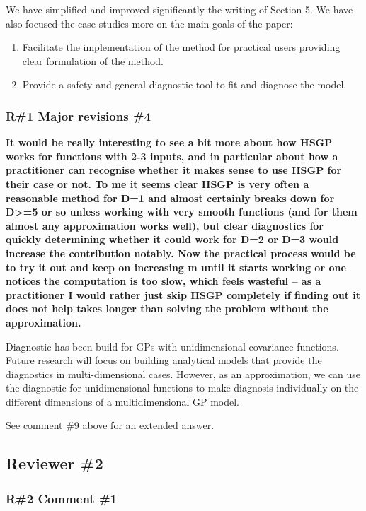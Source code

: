 \documentclass[11pt]{report}
\begin{document}
We have simplified and improved significantly the writing of Section 5. We have also focused the case studies more on the main goals of the paper:
\begin{enumerate}
\item Facilitate the implementation of the method for practical users providing clear formulation of the method.
\item Provide a safety and general diagnostic tool to fit and diagnose the model.
\end{enumerate}
 

\subsubsection*{R\#1 Major revisions \#4}

\textbf{It would be really interesting to see a bit more about how HSGP works for functions with 2-3 inputs, and in particular about how a practitioner can recognise whether it makes sense to use HSGP for their case or not. To me it seems clear HSGP is very often a reasonable method for D=1 and almost certainly breaks down for D>=5 or so unless working with very smooth functions (and for them almost any approximation works well), but clear diagnostics for quickly determining whether it could work for D=2 or D=3 would increase the contribution notably. Now the practical process would be to try it out and keep on increasing m until it starts working or one notices the computation is too slow, which feels wasteful -- as a practitioner I would rather just skip HSGP completely if finding out it does not help takes longer than solving the problem without the approximation.}

Diagnostic has been build for GPs with unidimensional covariance functions. Future research will focus on building analytical models that provide the diagnostics in multi-dimensional cases. However, as an approximation, we can use the diagnostic for unidimensional functions to make diagnosis individually on the different dimensions of a multidimensional GP model. 

See comment \#9 above for an extended answer.

\noindent \hdashrule{12.5cm}{0.2pt}{2mm 1pt}

\subsection*{Reviewer \#2}

\subsubsection*{R\#2 Comment \#1}
\end{document}
